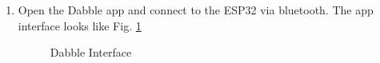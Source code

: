 \documentclass[conference]{IEEEtran}
\begin{document}
\begin{enumerate}[label=\thesection.\arabic*
,ref=\thesection.\theenumi]
\item Open the Dabble app and connect to the ESP32 via bluetooth. The app interface looks like Fig. \ref{fig:dabble_home}
\begin{figure}[!ht]
\centering
{}%
\caption{Dabble Interface}
\label{fig:dabble_home}
\end{figure}


\end{enumerate}
\end{document}
